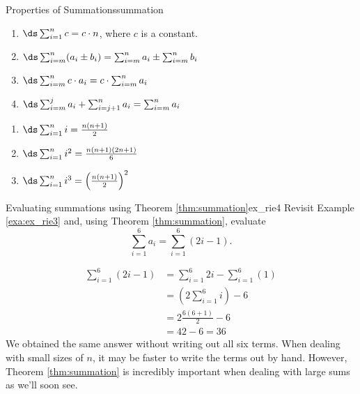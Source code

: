 \begin{theorem}{Properties of Summations}{summation}
{\noindent\begin{minipage}[t]{200pt}
\begin{enumerate}
		\item		$\ds \sum_{i=1}^n c = c\cdot n$, where $c$ is a constant.
		\item		$\ds \sum_{i=m}^n (a_i\pm b_i) = \sum_{i=m}^n a_i \pm \sum_{i=m}^n b_i$
		\item		$\ds \sum_{i=m}^n c\cdot a_i = c\cdot\sum_{i=m}^n a_i$
		\item		$\ds \sum_{i=m}^j a_i + \sum_{i=j+1}^n  a_i = \sum_{i=m}^n a_i$
	\end{enumerate}
\end{minipage}
\begin{minipage}[t]{200pt}
\begin{enumerate}\addtocounter{enumi}{4}
		\item		$\ds \sum_{i=1}^n i = \frac{n(n+1)}2$
		\item		$\ds \sum_{i=1}^n i^2 = \frac{n(n+1)(2n+1)}6$
		\item		$\ds \sum_{i=1}^n i^3 = \left(\frac{n(n+1)}2\right)^2$
	\end{enumerate}
\end{minipage}
}

\end{theorem}

\begin{example}{Evaluating summations using Theorem \ref{thm:summation}}{ex_rie4}
{Revisit Example \ref{exa:ex_rie3} and, using Theorem \ref{thm:summation}, evaluate $$\sum_{i=1}^6 a_i = \sum_{i=1}^6 (2i-1).$$
}
\end{example}
\begin{solution}
{\begin{align*}
		\sum_{i=1}^6 (2i-1) & = \sum_{i=1}^6 2i - \sum_{i=1}^6 (1)\\
												&=	\left(2\sum_{i=1}^6 i \right)- 6 \\
												&= 2\frac{6(6+1)}{2} - 6 \\
												&= 42-6 = 36
 \end{align*}
 We obtained the same answer without writing out all six terms. When dealing with small sizes of $n$, it may be faster to write the terms out by hand. However, Theorem \ref{thm:summation} is incredibly important when dealing with large sums as we'll soon see.
 }
 \end{solution}


